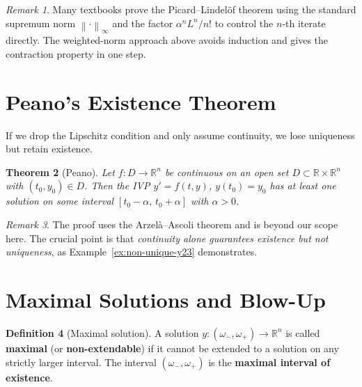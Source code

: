 \documentclass[12pt,a4paper,openany]{book}
\theoremstyle{definition}
\newtheorem{definition}{Definition}[chapter]
\theoremstyle{plain}
\newtheorem{theorem}[definition]{Theorem}
\theoremstyle{remark}
\newtheorem{remark}[definition]{Remark}
\newcommand{\R}{\mathbb{R}}
\newcommand{\norm}[1]{\left\|#1\right\|}
\begin{document}
\begin{remark}\label{rem:standard-proof}
Many textbooks prove the Picard--Lindel\"of theorem using the standard supremum
norm $\norm{\cdot}_\infty$ and the factor $\alpha^n L^n / n!$ to control the
$n$-th iterate directly. The weighted-norm approach above avoids induction and
gives the contraction property in one step.
\end{remark}

\section{Peano's Existence Theorem}\label{sec:peano}

If we drop the Lipschitz condition and only assume continuity, we lose
uniqueness but retain existence.

\begin{theorem}[Peano]\label{thm:peano}
Let $f\colon D \to \R^n$ be continuous on an open set
$D \subset \R \times \R^n$ with $(t_0, y_0) \in D$. Then the IVP
$y' = f(t,y)$, $y(t_0) = y_0$ has at least one solution on some interval
$[t_0 - \alpha, \, t_0 + \alpha]$ with $\alpha > 0$.
\end{theorem}

\begin{remark}\label{rem:peano-no-proof}
The proof uses the Arzel\`a--Ascoli theorem and is beyond our scope here.
The crucial point is that \emph{continuity alone guarantees existence but not
uniqueness}, as Example~\ref{ex:non-unique-y23} demonstrates.
\end{remark}

\section{Maximal Solutions and Blow-Up}\label{sec:maximal-solutions}

\begin{definition}[Maximal solution]\label{def:maximal-solution}
A solution $y\colon (\omega_-, \omega_+) \to \R^n$ is called \textbf{maximal}
(or \textbf{non-extendable}) if it cannot be extended to a solution on any
strictly larger interval. The interval $(\omega_-, \omega_+)$ is the
\textbf{maximal interval of existence}.
\end{definition}
\end{document}
